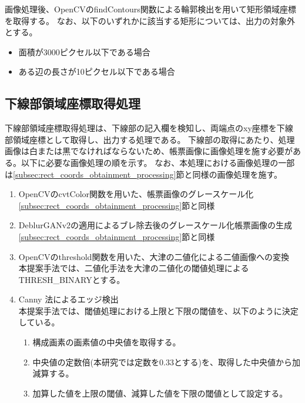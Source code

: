 画像処理後、OpenCVのfindContours関数による輪郭検出を用いて矩形領域座標を取得する。
なお、以下のいずれかに該当する矩形については、出力の対象外とする。

\begin{itemize}
    \item 面積が3000ピクセル以下である場合
    \item ある辺の長さが10ピクセル以下である場合
\end{itemize}


\subsection{下線部領域座標取得処理}\label{subsec:underline_coords_obtainment_processing}
下線部領域座標取得処理は、下線部の記入欄を検知し、両端点のxy座標を下線部領域座標として取得し、出力する処理である。
下線部の取得にあたり、処理画像は白または黒でなければならないため、帳票画像に画像処理を施す必要がある。以下に必要な画像処理の順を示す。
なお、本処理における画像処理の一部は\ref{subsec:rect_coords_obtainment_processing}節と同様の画像処理を施す。

\begin{enumerate}
    \item OpenCVのcvtColor関数を用いた、帳票画像のグレースケール化\\
        \ref{subsec:rect_coords_obtainment_processing}節と同様
    \item DeblurGANv2の適用によるブレ除去後のグレースケール化帳票画像の生成\\
        \ref{subsec:rect_coords_obtainment_processing}節と同様
    \item OpenCVのthreshold関数を用いた、大津の二値化による二値画像への変換\\
        本提案手法では、二値化手法を大津の二値化の閾値処理によるTHRESH\_BINARYとする。
    \item Canny 法によるエッジ検出\\
        本提案手法では、閾値処理における上限と下限の閾値を、以下のように決定している。
        \begin{enumerate}
            \item 構成画素の画素値の中央値を取得する。
            \item 中央値の定数倍(本研究では定数を0.33とする)を、取得した中央値から加減算する。
            \item 加算した値を上限の閾値、減算した値を下限の閾値として設定する。
        \end{enumerate}
\end{enumerate}

